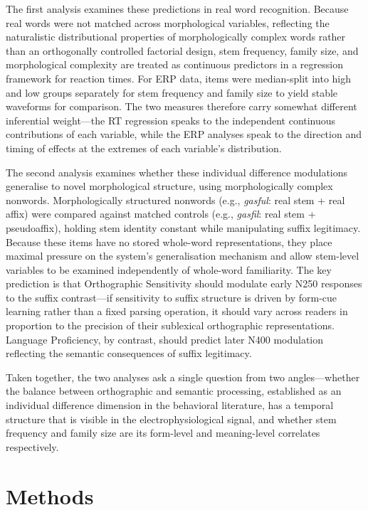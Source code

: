 \documentclass[utf8]{FrontiersinHarvard} %
\begin{document}
The first analysis examines these predictions in real word recognition. Because real words were not matched across morphological variables, reflecting the naturalistic distributional properties of morphologically complex words rather than an orthogonally controlled factorial design, stem frequency, family size, and morphological complexity are treated as continuous predictors in a regression framework for reaction times. For ERP data, items were median-split into high and low groups separately for stem frequency and family size to yield stable waveforms for comparison. The two measures therefore carry somewhat different inferential weight—the RT regression speaks to the independent continuous contributions of each variable, while the ERP analyses speak to the direction and timing of effects at the extremes of each variable's distribution.

The second analysis examines whether these individual difference modulations generalise to novel morphological structure, using morphologically complex nonwords. Morphologically structured nonwords (e.g., \textit{gasful}: real stem + real affix) were compared against matched controls (e.g., \textit{gasfil}: real stem + pseudoaffix), holding stem identity constant while manipulating suffix legitimacy. Because these items have no stored whole-word representations, they place maximal pressure on the system's generalisation mechanism and allow stem-level variables to be examined independently of whole-word familiarity. The key prediction is that Orthographic Sensitivity should modulate early N250 responses to the suffix contrast—if sensitivity to suffix structure is driven by form-cue learning rather than a fixed parsing operation, it should vary across readers in proportion to the precision of their sublexical orthographic representations. Language Proficiency, by contrast, should predict later N400 modulation reflecting the semantic consequences of suffix legitimacy.

Taken together, the two analyses ask a single question from two angles—whether the balance between orthographic and semantic processing, established as an individual difference dimension in the behavioral literature, has a temporal structure that is visible in the electrophysiological signal, and whether stem frequency and family size are its form-level and meaning-level correlates respectively.

\section{Methods}
\end{document}
